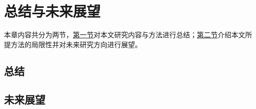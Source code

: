 \chapter[\hspace{0pt}总结与未来展望]{{\heiti{}\hspace{0pt}总结与未来展望}}\label{section 7}
\removelofgap
\removelotgap

本章内容共分为两节，\hyperref[section5: 总结]{第一节}对本文研究内容与方法进行总结；\hyperref[section5: 未来展望]{第二节}介绍本文所提方法的局限性并对未来研究方向进行展望。

\section[\hspace{-2pt}总结]{{\heiti{} \hspace{-8pt}总结}}\label{section5: 总结}


\section[\hspace{-2pt}未来展望]{{\heiti{} \hspace{-8pt}未来展望}}\label{section5: 未来展望}
